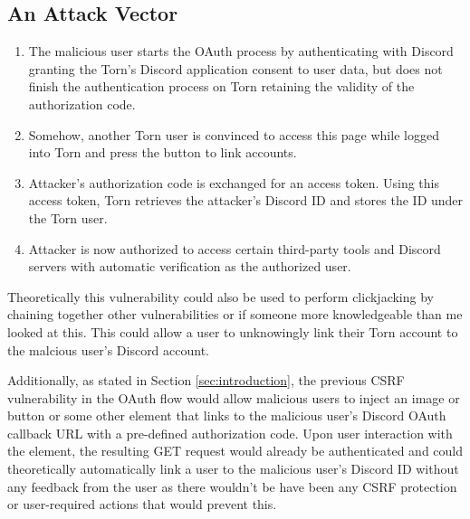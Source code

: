 \documentclass{article}
\begin{document}
{\subsection{An Attack Vector}
\begin{enumerate}
	\item The malicious user starts the OAuth process by authenticating with Discord granting the Torn's Discord application consent to user data, but does not finish the authentication process on Torn retaining the validity of the authorization code.
	\item Somehow, another Torn user is convinced to access this page while logged into Torn and press the button to link accounts.
	\item Attacker's authorization code is exchanged for an access token. Using this access token, Torn retrieves the attacker's Discord ID and stores the ID under the Torn user.
	\item Attacker is now authorized to access certain third-party tools and Discord servers with automatic verification as the authorized user.
\end{enumerate}

\par{Theoretically this vulnerability could also be used to perform clickjacking by chaining together other vulnerabilities or if someone more knowledgeable than me looked at this. This could allow a user to unknowingly link their Torn account to the malcious user's Discord account.}

\par{Additionally, as stated in Section \ref{sec:introduction}, the previous CSRF vulnerability in the OAuth flow would allow malicious users to inject an image or button or some other element that links to the malicious user's Discord OAuth callback URL with a pre-defined authorization code. Upon user interaction with the element, the resulting GET request would already be authenticated and could theoretically automatically link a user to the malicious user's Discord ID without any feedback from the user as there wouldn't be have been any CSRF protection or user-required actions that would prevent this.}

}
\end{document}
